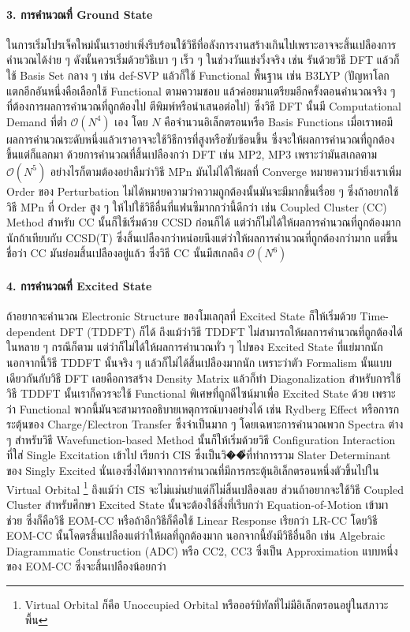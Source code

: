 \paragraph{3. การคำนวณที่ Ground State}
ในการเริ่มโปรเจ็คใหม่นั้นเราอย่าเพิ่งรีบร้อนใช้วิธีที่อลังการงานสร้างเกินไปเพราะอาจจะสิ้นเปลืองการคำนวณได้ง่าย ๆ ดังนั้นควรเริ่มด้วยวิธีเบา ๆ เร็ว ๆ
ในช่วงวันแข่งวิ่งจริง เช่น รันด้วยวิธี DFT แล้วก็ใช้ Basis Set กลาง ๆ เช่น def-SVP แล้วก็ใช้ Functional พื้นฐาน เช่น B3LYP
(ปัญหาโลกแตกอีกอันหนึ่งคือเลือกใช้ Functional ตามความชอบ แล้วค่อยมาเเตรียมอีกครั้งตอนคำนวณจริง ๆ ที่ต้องการผลการคำนวณที่ถูกต้องไป%
ตีพิมพ์หรือนำเสนอต่อไป) ซึ่งวิธี DFT นั้นมี Computational Demand ที่ต่ำ $\mathcal{O}(N^{4})$ เอง โดย $N$ คือจำนวนอิเล็กตรอนหรือ
Basis Functions เมื่อเราพอมีผลการคำนวณระดับหนึ่งแล้วเราอาจจะใช้วิธีการที่สูงหรือซับซ้อนขึ้น ซึ่งจะให้ผลการคำนวณที่ถูกต้องขึ้นแต่ก็แลกมา%
ด้วยการคำนวณที่สิ้นเปลืองกว่า DFT เช่น MP2, MP3 เพราะว่ามันสเกลตาม $\mathcal{O}(N^{5})$ อย่างไรก็ตามต้องอย่าลืมว่าวิธี MPn
มันไม่ได้ให้ผลที่ Converge หมายความว่ายิ่งเราเพิ่ม Order ของ Perturbation ไม่ได้หมายความว่าความถูกต้องนั้นมันจะมีมากขึ้นเรื่อย ๆ
ซึ่งถ้าอยากใช้วิธี MPn ที่ Order สูง ๆ ให้ไปใช้วิธีอื่นที่แฟนซีมากกว่านี้ดีกว่า เช่น Coupled Cluster (CC) Method สำหรับ CC นั้นก็ใช้เริ่มด้วย
CCSD ก่อนก็ได้ แต่ว่าก็ไม่ได้ให้ผลการคำนวณที่ถูกต้องมากนักถ้าเทียบกับ CCSD(T) ซึ่งสิ้นเปลืองกว่าหน่อยนึงแต่ว่าให้ผลการคำนวณที่ถูกต้องกว่ามาก
แต่ขึ้นชื่อว่า CC มันย่อมสิ้นเปลืองอยู่แล้ว ซึ่งวิธี CC นั้นมีสเกลถึง $\mathcal{O}(N^{6})$

\paragraph{4. การคำนวณที่ Excited State}
ถ้าอยากจะคำนวณ Electronic Structure ของโมเลกุลที่ Excited State ก็ให้เริ่มด้วย Time-dependent DFT (TDDFT) ก็ได้ ถึงแม้ว่าวิธี
TDDFT ไม่สามารถให้ผลการคำนวณที่ถูกต้องได้ในหลาย ๆ กรณีก็ตาม แต่ว่าก็ไม่ได้ให้ผลการคำนวณทั่ว ๆ ไปของ Excited State ที่แย่มากนัก
นอกจากนี้วิธี TDDFT นั้นจริง ๆ แล้วก็ไม่ได้สิ้นเปลืองมากนัก เพราะว่าตัว Formalism นั้นแบบเดียวกันกับวิธี DFT เลยคือการสร้าง Density Matrix
แล้วก็ทำ Diagonalization สำหรับการใช้วิธี TDDFT นั้นเราก็ควรจะใช้ Functional พิเศษที่ถูกดีไซน์มาเพื่อ Excited State ด้วย เพราะว่า
Functional พวกนี้มันจะสามารถอธิบายเหตุการณ์บางอย่างได้ เช่น Rydberg Effect หรือการกระตุ้นของ Charge/Electron Transfer
ซึ่งจำเป็นมาก ๆ โดยเฉพาะการคำนวณพวก Spectra ต่าง ๆ สำหรับวิธี Wavefunction-based Method นั้นก็ให้เริ่มด้วยวิธี Configuration
Interaction ที่ใส่ Single Excitation เข้าไป เรียกว่า CIS ซึ่งเป็นวิ��ีที่ทำการรวม Slater Determinant ของ Singly Excited
นั่นเองซึ่งได้มาจากการคำนวณที่มีการกระตุ้นอิเล็กตรอนหนึ่งตัวขึ้นไปใน Virtual Orbital \footnote{Virtual Orbital ก็คือ Unoccupied
  Orbital หรือออร์บิทัลที่ไม่มีอิเล็กตรอนอยู่ในสภาวะพื้น} ถึงแม้ว่า CIS จะไม่แม่นยำแต่ก็ไม่สิ้นเปลืองเลย ส่วนถ้าอยากจะใช้วิธี Coupled Cluster
สำหรับศึกษา Excited State นั้นจะต้องใช้สิ่งที่เรีบกว่า Equation-of-Motion เข้ามาช่วย ซึ่งก็คือวิธี EOM-CC หรือถ้าอีกวิธีก็คือใช้ Linear
Response เรียกว่า LR-CC โดยวิธี EOM-CC นั้นโคตรสิ้นเปลืองแต่ว่าให้ผลที่ถูกต้องมาก นอกจากนี้ยังมีวิธีอื่นอีก เช่น Algebraic Diagrammatic
Construction (ADC) หรือ CC2, CC3 ซึ่งเป็น Approximation แบบหนึ่งของ EOM-CC ซึ่งจะสิ้นเปลืองน้อยกว่า

